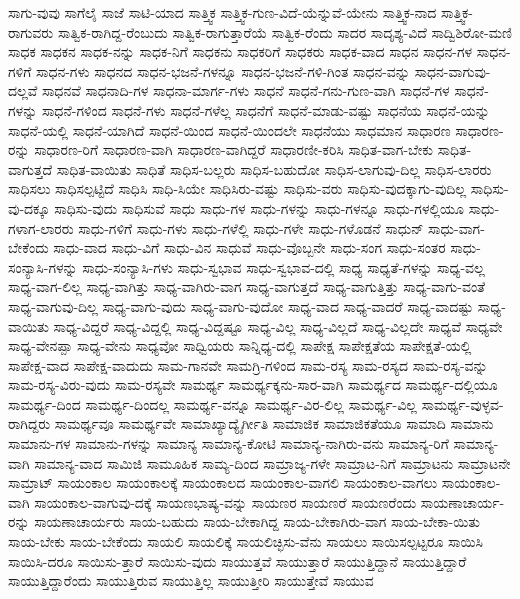 {ಸಾಗು-ವುವು
ಸಾಗೆಲೈ
ಸಾಜೆ
ಸಾಟಿ-ಯಾದ
ಸಾತ್ತ್ವಿಕ
ಸಾತ್ತ್ವಿಕ-ಗುಣ-ವಿದೆ-ಯೆನ್ನುವೆ-ಯೇನು
ಸಾತ್ತ್ವಿಕ-ನಾದ
ಸಾತ್ತ್ವಿಕ-ರಾಗುವರು
ಸಾತ್ವಿಕ-ರಾಗಿದ್ದ-ರೆಂಬುದು
ಸಾತ್ವಿಕ-ರಾಗುತ್ತಾರೆಯೆ
ಸಾತ್ವಿಕ-ರೆಂದು
ಸಾದರ
ಸಾದೃಶ್ಯ-ವಿದೆ
ಸಾದ್ವಿಶಿರೋ-ಮಣಿ
ಸಾಧಕ
ಸಾಧಕನ
ಸಾಧಕ-ನನ್ನು
ಸಾಧಕ-ನಿಗೆ
ಸಾಧಕನು
ಸಾಧಕರಿಗೆ
ಸಾಧಕರು
ಸಾಧಕ-ವಾದ
ಸಾಧನ
ಸಾಧನ-ಗಳ
ಸಾಧನ-ಗಳಿಗೆ
ಸಾಧನ-ಗಳು
ಸಾಧನದ
ಸಾಧನ-ಭಜನೆ-ಗಳನ್ನೂ
ಸಾಧನ-ಭಜನೆ-ಗಳಿ-ಗಿಂತ
ಸಾಧನ-ವನ್ನು
ಸಾಧನ-ವಾಗುವು-ದಲ್ಲವೆ
ಸಾಧನವೆ
ಸಾಧನಾದಿ-ಗಳ
ಸಾಧನಾ-ಮಾರ್ಗ-ಗಳು
ಸಾಧನೆ
ಸಾಧನೆ-ಗನು-ಗುಣ-ವಾಗಿ
ಸಾಧನೆ-ಗಳ
ಸಾಧನೆ-ಗಳನ್ನು
ಸಾಧನೆ-ಗಳಿಂದ
ಸಾಧನೆ-ಗಳು
ಸಾಧನೆ-ಗಳೆಲ್ಲ
ಸಾಧನೆಗೆ
ಸಾಧನೆ-ಮಾಡು-ವಷ್ಟು
ಸಾಧನೆಯ
ಸಾಧನೆ-ಯನ್ನು
ಸಾಧನೆ-ಯಲ್ಲಿ
ಸಾಧನೆ-ಯಾಗಿದೆ
ಸಾಧನೆ-ಯಿಂದ
ಸಾಧನೆ-ಯಿಂದಲೇ
ಸಾಧನೆಯು
ಸಾಧಮಾನ
ಸಾಧಾರಣ
ಸಾಧಾರಣ-ರನ್ನು
ಸಾಧಾರಣ-ರಿಗೆ
ಸಾಧಾರಣ-ವಾಗಿ
ಸಾಧಾರಣ-ವಾಗಿದ್ದರೆ
ಸಾಧಾರಣೀ-ಕರಿಸಿ
ಸಾಧಿತ-ವಾಗ-ಬೇಕು
ಸಾಧಿತ-ವಾಗುತ್ತದೆ
ಸಾಧಿತ-ವಾಯಿತು
ಸಾಧಿತೆ
ಸಾಧಿಸ-ಬಲ್ಲರು
ಸಾಧಿಸ-ಬಹುದೋ
ಸಾಧಿಸ-ಲಾಗುವು-ದಿಲ್ಲ
ಸಾಧಿಸ-ಲಾರರು
ಸಾಧಿಸಲು
ಸಾಧಿಸಲ್ಪಟ್ಟಿದೆ
ಸಾಧಿಸಿ
ಸಾಧಿ-ಸಿಯೇ
ಸಾಧಿಸಿರು-ವಷ್ಟು
ಸಾಧಿಸು-ವರು
ಸಾಧಿಸು-ವುದಕ್ಕಾಗು-ವುದಿಲ್ಲ
ಸಾಧಿಸು-ವು-ದಕ್ಕೂ
ಸಾಧಿಸು-ವುದು
ಸಾಧಿಸುವೆ
ಸಾಧು
ಸಾಧು-ಗಳ
ಸಾಧು-ಗಳನ್ನು
ಸಾಧು-ಗಳನ್ನೂ
ಸಾಧು-ಗಳಲ್ಲಿಯೂ
ಸಾಧು-ಗಳಾಗ-ಲಾರರು
ಸಾಧು-ಗಳಿಗೆ
ಸಾಧು-ಗಳು
ಸಾಧು-ಗಳೆಲ್ಲಿ
ಸಾಧು-ಗಳೇ
ಸಾಧು-ಗಳೊಡನೆ
ಸಾಧುನ್
ಸಾಧು-ವಾಗ-ಬೇಕೆಂದು
ಸಾಧು-ವಾದ
ಸಾಧು-ವಿಗೆ
ಸಾಧು-ವಿನ
ಸಾಧುವೆ
ಸಾಧು-ವೊಬ್ಬನೇ
ಸಾಧು-ಸಂಗ
ಸಾಧು-ಸಂತರ
ಸಾಧು-ಸಂನ್ಯಾಸಿ-ಗಳನ್ನು
ಸಾಧು-ಸಂನ್ಯಾಸಿ-ಗಳು
ಸಾಧು-ಸ್ವಭಾವ
ಸಾಧು-ಸ್ವಭಾವ-ದಲ್ಲಿ
ಸಾಧ್ಯ
ಸಾಧ್ಯತೆ-ಗಳನ್ನು
ಸಾಧ್ಯ-ವಲ್ಲ
ಸಾಧ್ಯ-ವಾಗ-ಲಿಲ್ಲ
ಸಾಧ್ಯ-ವಾಗಿತ್ತು
ಸಾಧ್ಯ-ವಾಗಿರು-ವಾಗ
ಸಾಧ್ಯ-ವಾಗುತ್ತದೆ
ಸಾಧ್ಯ-ವಾಗುತ್ತಿತ್ತು
ಸಾಧ್ಯ-ವಾಗು-ವಂತೆ
ಸಾಧ್ಯ-ವಾಗುವು-ದಿಲ್ಲ
ಸಾಧ್ಯ-ವಾಗು-ವುದು
ಸಾಧ್ಯ-ವಾಗು-ವುದೋ
ಸಾಧ್ಯ-ವಾದ
ಸಾಧ್ಯ-ವಾದರೆ
ಸಾಧ್ಯ-ವಾದಷ್ಟು
ಸಾಧ್ಯ-ವಾಯಿತು
ಸಾಧ್ಯ-ವಿದ್ದರೆ
ಸಾಧ್ಯ-ವಿದ್ದಲ್ಲಿ
ಸಾಧ್ಯ-ವಿದ್ದಷ್ಟೂ
ಸಾಧ್ಯ-ವಿಲ್ಲ
ಸಾಧ್ಯ-ವಿಲ್ಲದೆ
ಸಾಧ್ಯ-ವಿಲ್ಲದೇ
ಸಾಧ್ಯವೆ
ಸಾಧ್ಯವೇ
ಸಾಧ್ಯ-ವೇನಪ್ಪಾ
ಸಾಧ್ಯ-ವೇನು
ಸಾಧ್ಯವೋ
ಸಾಧ್ವಿಯರು
ಸಾನ್ನಿಧ್ಯ-ದಲ್ಲಿ
ಸಾಪೇಕ್ಷ
ಸಾಪೇಕ್ಷತೆಯ
ಸಾಪೇಕ್ಷತೆ-ಯಲ್ಲಿ
ಸಾಪೇಕ್ಷ-ವಾದ
ಸಾಪೇಕ್ಷ-ವಾದುದು
ಸಾಮ-ಗಾನವೇ
ಸಾಮಗ್ರಿ-ಗಳಿಂದ
ಸಾಮ-ರಸ್ಯ
ಸಾಮ-ರಸ್ಯದ
ಸಾಮ-ರಸ್ಯ-ವನ್ನು
ಸಾಮ-ರಸ್ಯ-ವಿರು-ವುದು
ಸಾಮ-ರಸ್ಯವೇ
ಸಾಮರ್ಥ್ಯ
ಸಾಮರ್ಥ್ಯಕ್ಕನು-ಸಾರ-ವಾಗಿ
ಸಾಮರ್ಥ್ಯದ
ಸಾಮರ್ಥ್ಯ-ದಲ್ಲಿಯೂ
ಸಾಮರ್ಥ್ಯ-ದಿಂದ
ಸಾಮರ್ಥ್ಯ-ದಿಂದಲ್ಲ
ಸಾಮರ್ಥ್ಯ-ವನ್ನೂ
ಸಾಮರ್ಥ್ಯ-ವಿರ-ಲಿಲ್ಲ
ಸಾಮರ್ಥ್ಯ-ವಿಲ್ಲ
ಸಾಮರ್ಥ್ಯ-ವುಳ್ಳವ-ರಾಗಿದ್ದರು
ಸಾಮರ್ಥ್ಯವೂ
ಸಾಮರ್ಥ್ಯವೇ
ಸಾಮಾಖ್ಯಾದ್ಯೈರ್ಗೀತಿ
ಸಾಮಾಜಿಕ
ಸಾಮಾಜಿಕತೆಯೂ
ಸಾಮಾದಿ
ಸಾಮಾನು
ಸಾಮಾನು-ಗಳ
ಸಾಮಾನು-ಗಳನ್ನು
ಸಾಮಾನ್ಯ
ಸಾಮಾನ್ಯ-ಕೋಟಿ
ಸಾಮಾನ್ಯ-ನಾಗಿರು-ವನು
ಸಾಮಾನ್ಯ-ರಿಗೆ
ಸಾಮಾನ್ಯ-ವಾಗಿ
ಸಾಮಾನ್ಯ-ವಾದ
ಸಾಮಿಜಿ
ಸಾಮೂಹಿಕ
ಸಾಮ್ಯ-ದಿಂದ
ಸಾಮ್ರಾಜ್ಯ-ಗಳೇ
ಸಾಮ್ರಾಟ-ನಿಗೆ
ಸಾಮ್ರಾಟನು
ಸಾಮ್ರಾಟನೇ
ಸಾಮ್ರಾಟ್
ಸಾಯಂಕಾಲ
ಸಾಯಂಕಾಲಕ್ಕೆ
ಸಾಯಂಕಾಲದ
ಸಾಯಂಕಾಲ-ವಾಗಲಿ
ಸಾಯಂಕಾಲ-ವಾಗಲು
ಸಾಯಂಕಾಲ-ವಾಗಿ
ಸಾಯಂಕಾಲ-ವಾಗುವು-ದಕ್ಕೆ
ಸಾಯಣಭಾಷ್ಯ-ವನ್ನು
ಸಾಯಣರ
ಸಾಯಣರೆ
ಸಾಯಣರೆಂದು
ಸಾಯಣಾಚಾರ್ಯ-ರನ್ನು
ಸಾಯಣಾಚಾರ್ಯರು
ಸಾಯ-ಬಹುದು
ಸಾಯ-ಬೇಕಾಗಿದ್ದ
ಸಾಯ-ಬೇಕಾಗಿರು-ವಾಗ
ಸಾಯ-ಬೇಕಾ-ಯಿತು
ಸಾಯ-ಬೇಕು
ಸಾಯ-ಬೇಕೆಂದು
ಸಾಯಲಿ
ಸಾಯಲಿಕ್ಕೆ
ಸಾಯಲಿಚ್ಛಿಸು-ವೆನು
ಸಾಯಲು
ಸಾಯಿಸಲ್ಪಟ್ಟರೂ
ಸಾಯಿಸಿ
ಸಾಯಿಸಿ-ದರೂ
ಸಾಯಿಸು-ತ್ತಾರೆ
ಸಾಯಿಸು-ವುದು
ಸಾಯುತ್ತವೆ
ಸಾಯುತ್ತಾರೆ
ಸಾಯುತ್ತಿದ್ದಾನೆ
ಸಾಯುತ್ತಿದ್ದಾರೆ
ಸಾಯುತ್ತಿದ್ದಾರೆಂದು
ಸಾಯುತ್ತಿರುವ
ಸಾಯುತ್ತಿಲ್ಲ
ಸಾಯುತ್ತೀರಿ
ಸಾಯುತ್ತೇವೆ
ಸಾಯುವ
}
